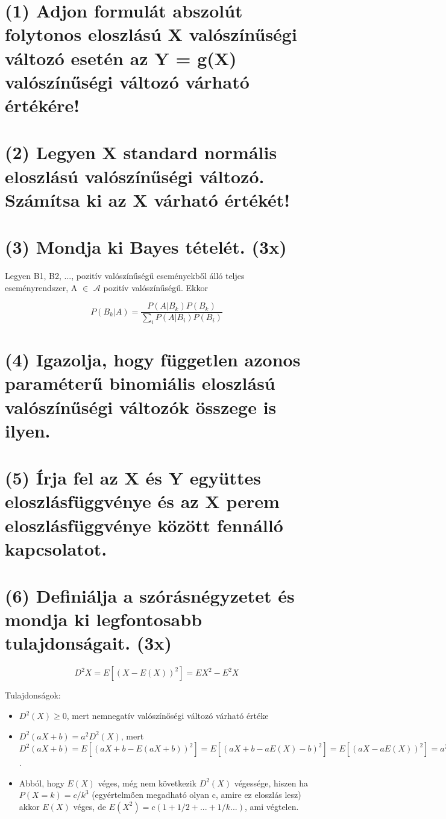 \documentclass[12p]{article}
\begin{document}
\section{(1) Adjon formulát abszolút folytonos eloszlású X valószínűségi változó esetén az Y = g(X) valószínűségi változó várható értékére!}

\section{(2) Legyen X standard normális eloszlású valószínűségi változó. Számítsa ki az X várható értékét! }

\section{(3) Mondja ki Bayes tételét. (3x)}

Legyen B1, B2, ..., pozitív valószínűségű eseményekből álló teljes eseményrendszer, A $\in$ $\mathscr{A}$ pozitív valószínűségű. Ekkor

$$\displaystyle{P(B_k|A) = \frac{P(A|B_k)P(B_k)}{\displaystyle{\sum_i} P(A|B_i)P(B_i)}}$$

\section{(4) Igazolja, hogy független azonos paraméterű binomiális eloszlású valószínűségi változók összege is ilyen.}

\section{(5) Írja fel az X és Y együttes eloszlásfüggvénye és az X perem eloszlásfüggvénye között fennálló kapcsolatot.}

\section{(6)  Definiálja a szórásnégyzetet és mondja ki legfontosabb tulajdonságait. (3x)}

$$D^2X = E[(X - E(X))^2] = EX^2 - E^2X$$

Tulajdonságok:

\begin{itemize}
	\item $D^2(X) \geq 0$, mert nemnegatív valószínőségi változó várható értéke
	\item $D^2(aX+b)=a^2D^2(X)$, mert $D^2(aX+b)=E[(aX+b-E(aX+b))^2]= E[(aX+b-aE(X)-b)^2]=E[(aX-aE(X))^2]=a^2 E[(X-E(X))^2]$.
	\item Abból, hogy $E(X)$ véges, még nem következik $D^2(X)$ végessége, hiszen ha $P(X=k)=c/k^3$ (egyértelmően megadható olyan c, amire ez eloszlás lesz) akkor $E(X)$ véges, de $E(X^2)=c(1+1/2+...+1/k...)$, ami végtelen.
\end{itemize}
\end{document}
